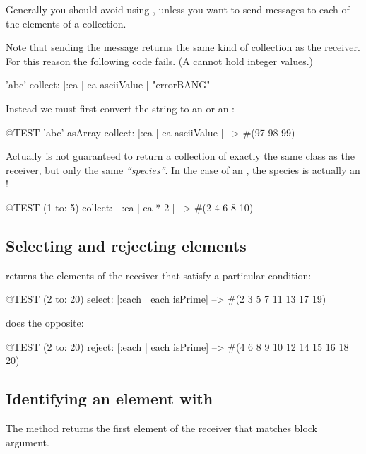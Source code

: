 \documentclass[a4paper,10pt,twoside]{book}
\begin{document}
Generally you should avoid using , unless you want to send messages to each of the elements of a collection.

Note that sending the message  returns the same kind of collection as the receiver.
For this reason the following code fails.
(A  cannot hold integer values.)
\begin{code}{}
'abc' collect: [:ea | ea asciiValue ]      "errorBANG"
\end{code}
\noindent
Instead we must first convert the string to an  or an :
\begin{code}{@TEST}
'abc' asArray collect: [:ea | ea asciiValue ] --> #(97 98 99)
\end{code}

Actually  is not guaranteed to return a collection of exactly the same class as the receiver, but only the same \emph{``species''}.  In the case of an , the species is actually an !
\begin{code}{@TEST}
(1 to: 5) collect: [ :ea | ea * 2 ] --> #(2 4 6 8 10)
\end{code}

\subsection{Selecting and rejecting elements}

 returns the elements of the receiver that satisfy a particular condition:

\begin{code}{@TEST}
(2 to: 20) select: [:each | each isPrime] --> #(2 3 5 7 11 13 17 19)
\end{code}

 does the opposite:
\begin{code}{@TEST}
(2 to: 20) reject: [:each | each isPrime] --> #(4 6 8 9 10 12 14 15 16 18 20)
\end{code}

\subsection{Identifying an element with }
The method  returns the first element of the receiver that matches block argument. 
\end{document}
